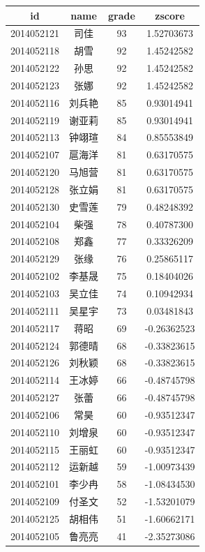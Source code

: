 \documentclass[hyperref,adobefonts]{ctexart}
\begin{document}
\begin{longtable}{c|c|c|c}
\hline
id & name & grade & zscore\\
\hline
2014052121 & 司佳 & 93 & 1.52703673\\
\hline
2014052118 & 胡雪 & 92 & 1.45242582\\
\hline
2014052122 & 孙思 & 92 & 1.45242582\\
\hline
2014052123 & 张娜 & 92 & 1.45242582\\
\hline
2014052116 & 刘兵艳 & 85 & 0.93014941\\
\hline
2014052119 & 谢亚莉 & 85 & 0.93014941\\
\hline
2014052113 & 钟翊瑄 & 84 & 0.85553849\\
\hline
2014052107 & 扈海洋 & 81 & 0.63170575\\
\hline
2014052120 & 马旭营 & 81 & 0.63170575\\
\hline
2014052128 & 张立娟 & 81 & 0.63170575\\
\hline
2014052130 & 史雪莲 & 79 & 0.48248392\\
\hline
2014052104 & 柴强 & 78 & 0.40787300\\
\hline
2014052108 & 郑鑫 & 77 & 0.33326209\\
\hline
2014052129 & 张缘 & 76 & 0.25865117\\
\hline
2014052102 & 李基晟 & 75 & 0.18404026\\
\hline
2014052103 & 吴立佳 & 74 & 0.10942934\\
\hline
2014052111 & 吴星宇 & 73 & 0.03481843\\
\hline
2014052117 & 蒋昭 & 69 & -0.26362523\\
\hline
2014052124 & 郭德晴 & 68 & -0.33823615\\
\hline
2014052126 & 刘秋颖 & 68 & -0.33823615\\
\hline
2014052114 & 王冰婷 & 66 & -0.48745798\\
\hline
2014052127 & 张蕾 & 66 & -0.48745798\\
\hline
2014052106 & 常昊 & 60 & -0.93512347\\
\hline
2014052110 & 刘增泉 & 60 & -0.93512347\\
\hline
2014052115 & 王丽虹 & 60 & -0.93512347\\
\hline
2014052112 & 运新越 & 59 & -1.00973439\\
\hline
2014052101 & 李少冉 & 58 & -1.08434530\\
\hline
2014052109 & 付圣文 & 52 & -1.53201079\\
\hline
2014052125 & 胡相伟 & 51 & -1.60662171\\
\hline
2014052105 & 鲁亮亮 & 41 & -2.35273086\\
\hline
\end{longtable}
\end{document}
